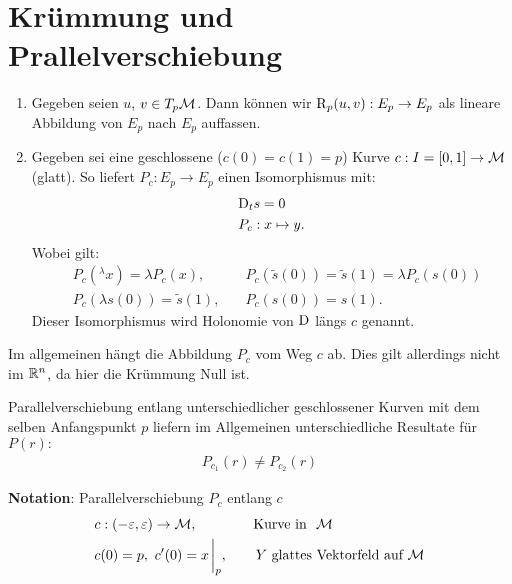 \section{Krümmung und Prallelverschiebung}
\begin{enumerate}
\item Gegeben seien $u$, $v \in T_p \mathcal{M}$.
Dann können wir $\operatorname{R}_p (u, v) : E_p \to E_p$ als lineare Abbildung von $E_p$ nach $E_p$ auffassen.
\item Gegeben sei eine geschlossene ($c(0)= c(1) = p$) Kurve $c : I=[ 0, 1 ] \to \mathcal{M}$ (glatt).
So liefert $P_c : E_p \to E_p$ einen Isomorphismus mit:
\begin{align}
&\mathrm{D}_t s = 0\\
&P_c : x \mapsto y.
\end{align}
Wobei gilt:
\begin{align*}
&P_c (^\lambda x) = \lambda P_c (x), \quad &P_c (\tilde{s}(0)) = \tilde{s}(1) = \lambda P_c(s(0))\\
&P_c(\lambda s(0)) = \tilde{s}(1), \quad & P_c (s(0)) = s(1).
\end{align*}
Dieser Isomorphismus wird Holonomie von $\mathrm{D}$ längs $c$ genannt.
\end{enumerate}
\begin{bem}
Im allgemeinen hängt die Abbildung $P_c$ vom Weg $c$ ab. 
Dies gilt allerdings nicht im $\mathbb{R}^n$, da hier die Krümmung Null ist.
\end{bem}
Parallelverschiebung entlang unterschiedlicher geschlossener Kurven mit dem selben Anfangspunkt $p$ liefern im Allgemeinen unterschiedliche Resultate für $P(r): $
\begin{align*}
P_{c_1} (r) \neq P_{c_2}(r)
\end{align*}

\textbf{Notation}:
Parallelverschiebung $P_c$ entlang $c$
\begin{align*}
& c: (-\epsilon, \epsilon) \to \mfk, \qquad \qquad \text{Kurve in } \ \mfk \\
&c(0)= p, \ c'(0) = x \eval_p, \qquad Y \ \text{glattes Vektorfeld auf} \  \mfk
\end{align*}


